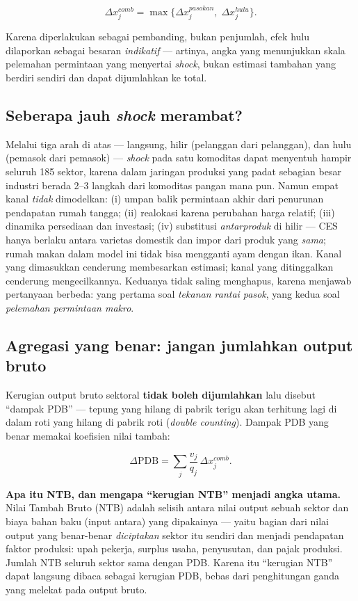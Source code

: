 \documentclass[
  manuscript=article,
  layout=publish,
  year=2026,
  volume=1,
]{den}
\begin{document}
\[
\Delta x^{comb}_j = \max\bigl\{\Delta x^{pasokan}_j,\; \Delta x^{hulu}_j\bigr\}.
\]

Karena diperlakukan sebagai pembanding, bukan penjumlah, efek hulu
dilaporkan sebagai besaran \emph{indikatif} --- artinya, angka yang
menunjukkan skala pelemahan permintaan yang menyertai \emph{shock},
bukan estimasi tambahan yang berdiri sendiri dan dapat dijumlahkan ke
total.

\subsection{\texorpdfstring{Seberapa jauh \emph{shock}
merambat?}{Seberapa jauh shock merambat?}}\label{seberapa-jauh-shock-merambat}

Melalui tiga arah di atas --- langsung, hilir (pelanggan dari
pelanggan), dan hulu (pemasok dari pemasok) --- \emph{shock} pada satu
komoditas dapat menyentuh hampir seluruh 185 sektor, karena dalam
jaringan produksi yang padat sebagian besar industri berada 2--3 langkah
dari komoditas pangan mana pun. Namun empat kanal \emph{tidak}
dimodelkan: (i) umpan balik permintaan akhir dari penurunan pendapatan
rumah tangga; (ii) realokasi karena perubahan harga relatif; (iii)
dinamika persediaan dan investasi; (iv) substitusi \emph{antarproduk} di
hilir --- CES hanya berlaku antara varietas domestik dan impor dari
produk yang \emph{sama}; rumah makan dalam model ini tidak bisa
mengganti ayam dengan ikan. Kanal yang dimasukkan cenderung membesarkan
estimasi; kanal yang ditinggalkan cenderung mengecilkannya. Keduanya
tidak saling menghapus, karena menjawab pertanyaan berbeda: yang pertama
soal \emph{tekanan rantai pasok}, yang kedua soal \emph{pelemahan
permintaan makro}.

\subsection{Agregasi yang benar: jangan jumlahkan output
bruto}\label{agregasi-yang-benar-jangan-jumlahkan-output-bruto}

Kerugian output bruto sektoral \textbf{tidak boleh dijumlahkan} lalu
disebut ``dampak PDB'' --- tepung yang hilang di pabrik terigu akan
terhitung lagi di dalam roti yang hilang di pabrik roti (\emph{double
counting}). Dampak PDB yang benar memakai koefisien nilai tambah:

\[
\Delta \text{PDB} = \sum_j \frac{v_j}{q_j}\,\Delta x^{comb}_j .
\]

\begin{intuisi}

\textbf{Apa itu NTB, dan mengapa ``kerugian NTB'' menjadi angka utama.}
Nilai Tambah Bruto (NTB) adalah selisih antara nilai output sebuah
sektor dan biaya bahan baku (input antara) yang dipakainya --- yaitu
bagian dari nilai output yang benar-benar \emph{diciptakan} sektor itu
sendiri dan menjadi pendapatan faktor produksi: upah pekerja, surplus
usaha, penyusutan, dan pajak produksi. Jumlah NTB seluruh sektor sama
dengan PDB. Karena itu ``kerugian NTB'' dapat langsung dibaca sebagai
kerugian PDB, bebas dari penghitungan ganda yang melekat pada output
bruto.

\end{intuisi}
\end{document}
